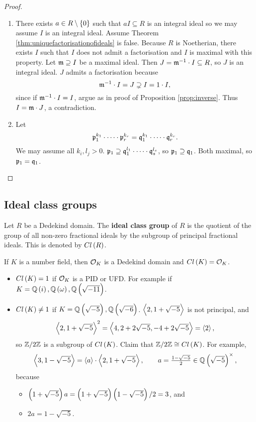 \begin{proof}
\hfill
\begin{enumerate}
\item There exists $ a \in R \setminus \cbr{0} $ such that $ aI \subseteq R $ is an integral ideal so we may assume $ I $ is an integral ideal. Assume Theorem \ref{thm:uniquefactorisationofideals} is false. Because $ R $ is Noetherian, there exists $ I $ such that $ I $ does not admit a factorisation and $ I $ is maximal with this property. Let $ \mathfrak{m} \supseteq I $ be a maximal ideal. Then $ J = \mathfrak{m}^{-1} \cdot I \subseteq R $, so $ J $ is an integral ideal. $ J $ admits a factorisation because
$$ \mathfrak{m}^{-1} \cdot I = J \supsetneq I = 1 \cdot I, $$
since if $ \mathfrak{m}^{-1} \cdot I = I $, argue as in proof of Proposition \ref{prop:inverse}. Thus $ I = \mathfrak{m} \cdot J $, a contradiction.
\item Let
$$ \mathfrak{p}_1^{k_1} \cdot \dots \cdot \mathfrak{p}_r^{k_r} = \mathfrak{q}_1^{k_1} \cdot \dots \cdot \mathfrak{q}_r^{k_r}. $$
We may assume all $ k_i, l_j > 0 $. $ \mathfrak{p}_1 \supseteq \mathfrak{q}_1^{l_1} \cdot \dots \cdot \mathfrak{q}_s^{l_s} $, so $ \mathfrak{p}_1 \supseteq \mathfrak{q}_1 $. Both maximal, so $ \mathfrak{p}_1 = \mathfrak{q}_1 $.
\end{enumerate}
\end{proof}


\subsection{Ideal class groups}

\begin{definition}
Let $ R $ be a Dedekind domain. The \textbf{ideal class group} of $ R $ is the quotient of the group of all non-zero fractional ideals by the subgroup of principal fractional ideals. This is denoted by $ Cl\br{R} $.
\end{definition}

If $ K $ is a number field, then $ \mathcal{O}_K $ is a Dedekind domain and $ Cl\br{K} = \OO_K $.

\begin{example*}
\hfill
\begin{itemize}
\item $ Cl\br{K} = 1 $ if $ \mathcal{O}_K $ is a PID or UFD. For example if $ K = \Q\br{i}, \Q\br{\omega}, \Q\br{\sqrt{-11}} $.
\item $ Cl\br{K} \ne 1 $ if $ K = \Q\br{\sqrt{-5}}, \Q\br{\sqrt{-6}} $. $ \left\langle 2, 1 + \sqrt{-5} \right\rangle $ is not principal, and
$$ \left\langle 2, 1 + \sqrt{-5} \right\rangle^2 = \left\langle 4, 2 + 2\sqrt{-5}, -4 + 2\sqrt{-5} \right\rangle = \left\langle 2 \right\rangle, $$
so $ \mathbb{Z} / 2\mathbb{Z} $ is a subgroup of $ Cl\br{K} $. Claim that $ \Z / 2\Z \cong Cl\br{K} $. For example,
$$ \abr{3, 1 - \sqrt{-5}} = \abr{a} \cdot \abr{2, 1 + \sqrt{-5}}, \qquad a = \tfrac{1 - \sqrt{-5}}{2} \in \Q\br{\sqrt{-5}}^\times, $$
because
\begin{itemize}
\item $ \br{1 + \sqrt{-5}}a = \br{1 + \sqrt{-5}}\br{1 - \sqrt{-5}} / 2 = 3 $, and
\item $ 2a = 1 - \sqrt{-5} $.
\end{itemize}
\end{itemize}
\end{example*}

